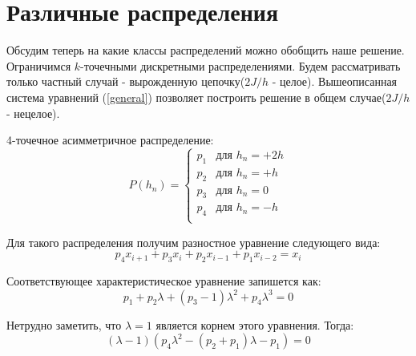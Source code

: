 \section{Различные распределения}
Обсудим теперь на какие классы распределений можно обобщить наше решение. Ограничимся $k$-точечными дискретными распределениями.
Будем рассматривать только частный случай - вырожденную цепочку($2J/h$ - целое). Вышеописанная система уравнений (\ref{general}) позволяет построить решение в общем случае($2J/h$ - нецелое).

4-точечное асимметричное распределение:
\begin{equation}
P(h_n) =
\begin{cases}
p_1 &\mbox{для } h_n= +2h \\
p_2 &\mbox{для } h_n= +h \\
p_3 &\mbox{для } h_n= 0\\
p_4 &\mbox{для } h_n = -h\\
\end{cases}
\end{equation}

Для такого распределения получим разностное уравнение следующего вида:
\begin{equation}
	p_4 x_{i+1} + p_3 x_{i} + p_2 x_{i-1} +p_1 x_{i-2} = x_{i}
\end{equation}

Соответствующее характеристическое уравнение запишется как:
\begin{equation}
	p_1+ p_2\lambda + (p_3-1) \lambda^2 + p_4 \lambda^3 = 0
\end{equation}

Нетрудно заметить, что $\lambda=1$ является корнем этого уравнения. Тогда:
\begin{equation}
(\lambda - 1)(p_4 \lambda^2 - (p_2 + p_1)\lambda - p_1	) =0
\end{equation}

